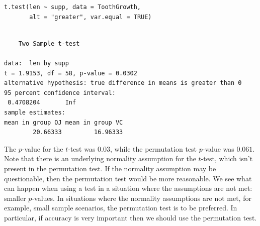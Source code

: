 \documentclass[captions=tableheading]{scrbook}
\begin{document}
\begin{verbatim}
t.test(len ~ supp, data = ToothGrowth, 
       alt = "greater", var.equal = TRUE)
\end{verbatim}


\begin{verbatim}

	Two Sample t-test

data:  len by supp 
t = 1.9153, df = 58, p-value = 0.0302
alternative hypothesis: true difference in means is greater than 0 
95 percent confidence interval:
 0.4708204       Inf 
sample estimates:
mean in group OJ mean in group VC 
        20.66333         16.96333
\end{verbatim}



The \(p\)-value for the \(t\)-test was \(  0.03 \), while the permutation test \(p\)-value was \(  0.061 \). Note that there is an underlying normality assumption for the \(t\)-test, which isn't present in the permutation test. If the normality assumption may be questionable, then the permutation test would be more reasonable. We see what can happen when using a test in a situation where the assumptions are not met: smaller \(p\)-values. In situations where the normality assumptions are not met, for example, small sample scenarios, the permutation test is to be preferred. In particular, if accuracy is very important then we should use the permutation test. 
\end{document}
